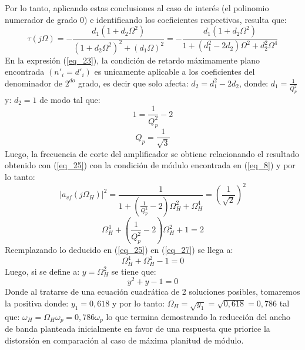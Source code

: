 \documentclass[12pt,a4paper]{article}
\begin{document}
\begin{itemize}
    Por lo tanto, aplicando estas conclusiones al caso de interés (el polinomio numerador de grado 0) e identificando los coeficientes respectivos, resulta que:
    \begin{equation}
        \label{eq_23}
        \tau(j\Omega) = - \frac{d_{1}(1 + d_{2}\Omega^{2})}{(1 + d_{2}\Omega^{2})^{2} + (d_{1}\Omega)^{2}} = -\frac{d_{1}(1 + d_{2}\Omega^{2})}{1 + (d_{1}^{2} - 2d_{2})\Omega^{2} + d_{2}^{2}\Omega^{4}}
    \end{equation}
    En la expresión (\ref{eq_23}), la condición de retardo máximamente plano encontrada $(n'_{i} = d'_{i})$ es unicamente aplicable a los coeficientes del denominador de $2^{do}$ grado, es decir que solo afecta: $d_{2} = d_{1}^{2} - 2d_{2}$, donde: $d_{1} = \frac{1}{Q_{p}^{2}}$ y: $d_{2} = 1$ de modo tal que:
    \begin{equation}
        \label{eq_24}
        1 = \frac{1}{Q_{p}^{2}} - 2
    \end{equation}
    \begin{equation}
        \label{eq_25}
        Q_{p} = \frac{1}{\sqrt{3}}
    \end{equation}
    Luego, la frecuencia de corte del amplificador se obtiene relacionando el resultado obtenido con (\ref{eq_25}) con la condición de módulo encontrada en (\ref{eq_8}) y por lo tanto:
    \begin{equation}
        \label{eq_26}
        |a_{vf}(j\Omega_H)|^{2} = \frac{1}{1 + \left(\frac{1}{Q_{p}^{2}} - 2\right)\Omega_{H}^{2} + \Omega_{H}^{4}} = \left(\frac{1}{\sqrt{2}}\right)^{2}
    \end{equation}
    \begin{equation}
        \label{eq_27}
        \Omega_H^4 + \left(\frac{1}{Q_p^2} - 2\right)\Omega_H^2 +  1 = 2
    \end{equation}
    Reemplazando lo deducido en (\ref{eq_25}) en (\ref{eq_27}) se llega a:
    \begin{equation}
        \label{eq_28}
        \Omega_{H}^{4} + \Omega_{H}^{2} - 1 = 0
    \end{equation}
    Luego, si se define a: $y = \Omega_{H}^{2}$ se tiene que:
    \begin{equation}
        \label{eq_29}
        y^{2} + y - 1 = 0
    \end{equation}
    Donde al tratarse de una ecuación cuadrática de 2 soluciones posibles, tomaremos la positiva donde: $y_{1} = 0,618$ y por lo tanto: $\Omega_H = \sqrt{y_{1}} = \sqrt{0,618} = 0,786$ tal que: $\omega_{H} = \Omega_{H} \omega_{p} = 0,786 \omega_{p}$ lo que termina demostrando la reducción del ancho de banda planteada inicialmente en favor de una respuesta que priorice la distorsión en comparación al caso de máxima planitud de módulo.

\end{itemize}
\end{document}
